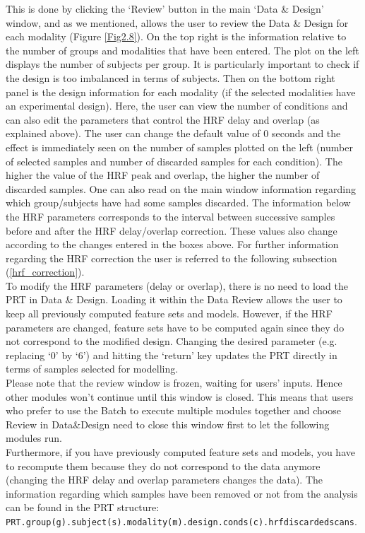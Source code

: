 This is done by clicking the `Review' button in the main `Data \& Design' window, and as we mentioned, allows the user to review the Data \& Design for each modality (Figure \ref{Fig2.8}). On the top right is the information relative to the number of groups and modalities that have been entered. The plot on the left displays the number of subjects per group. It is particularly important to check if the design is too imbalanced in terms of subjects. Then on the bottom right panel is the design information for each modality (if the selected modalities have an experimental design). Here, the user can view the number of conditions and can also edit the parameters that control the HRF delay and overlap (as explained above). The user can change the default value of 0 seconds and the effect is immediately seen on the number of samples plotted on the left (number of selected samples and number of discarded samples for each condition). The higher the value of the HRF peak and overlap, the higher the number of discarded samples. One can also read on the main \matlab{} window information regarding which group/subjects have had some samples discarded. The information below the HRF parameters corresponds to the interval between successive samples before and after the HRF delay/overlap correction. These values also change according to the changes entered in the boxes above. For further information regarding the HRF correction the user is referred to the following subsection (\ref{hrf_correction}). 
\\

To modify the HRF parameters (delay or overlap), there is no need to load the PRT in Data \& Design. Loading it within the Data Review allows the user to keep all previously computed feature sets and models. However, if the HRF parameters are changed, feature sets have to be computed again since they do not correspond to the modified design. Changing the desired parameter (e.g. replacing `0' by `6') and hitting the `return' key updates the PRT directly in terms of samples selected for modelling.
\\

Please note that the review window is frozen, waiting for users' inputs. Hence other modules won't continue until this window is closed. This means that users who prefer to use the Batch to execute multiple modules together and choose Review in Data\&Design need to close this window first to let the following modules run. 
\\

Furthermore, if you have previously computed feature sets and models, you have to recompute them because they do not correspond to the data anymore (changing the HRF delay and overlap parameters changes the data). The information regarding which samples have been removed or not from the analysis can be found in the PRT structure: \\
{\tt PRT.group(g).subject(s).modality(m).design.conds(c).hrfdiscardedscans}.


